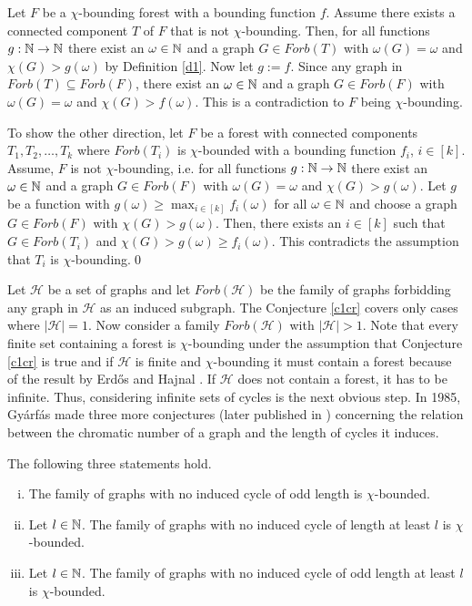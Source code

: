 \begin{prf}
Let $F$ be a $\chi$-bounding forest with a bounding function $f$. Assume there exists a connected component $T$ of $F$ that is not $\chi$-bounding. Then, for all functions $g:\mathbb{N}\to\mathbb{N}$ there exist an $\omega\in\mathbb{N}$ and a graph $G\in \textit{Forb}(T)$ with $\omega (G)=\omega$ and $\chi (G)>g(\omega)$ by Definition \ref{d1}. Now let $g:=f$. Since any graph in $\textit{Forb}(T)\subseteq\textit{Forb}(F)$, there exist an $\omega\in\mathbb{N}$ and a graph $G\in\textit{Forb}(F)$ with $\omega (G) =\omega $ and $\chi (G)>f(\omega )$. This is a contradiction to $F$ being $\chi$-bounding.

To show the other direction, let $F$ be a forest with connected components $T_1, T_2,\dots ,T_k$ where $\textit{Forb}	(T_i)$ is $\chi$-bounded with a bounding function $f_i$, $i\in [k]$. Assume, $F$ is not $\chi$-bounding, i.e. for all functions $g:\mathbb{N}\to\mathbb{N}$ there exist an $\omega\in\mathbb{N}$ and a graph $G\in \textit{Forb}(F)$ with $\omega (G)=\omega$ and $\chi (G)>g(\omega)$. Let $g$ be a function with $g(\omega )\geq\max_{i\in [k]}f_i(\omega )$ for all $\omega\in\mathbb{N}$ and choose a graph $G\in\textit{Forb}(F)$ with $\chi (G)>g(\omega)$. Then, there exists an $i\in [k]$ such that $G\in\textit{Forb}(T_i)$ and $\chi (G)>g(\omega )\geq f_i(\omega )$. This contradicts the assumption that $T_i$ is $\chi$-bounding.\qed
\end{prf}

Let $\mathcal{H}$ be a set of graphs and let $\textit{Forb}(\mathcal{H})$ be the family of graphs forbidding any graph in $\mathcal{H}$ as an induced subgraph. The Conjecture \ref{c1cr} covers only cases where $\vert\mathcal{H}\vert =1$.
Now consider a family $\textit{Forb}(\mathcal{H})$ with $\vert\mathcal{H}\vert >1$. Note that every finite set containing a forest is $\chi$-bounding under the assumption that Conjecture \ref{c1cr} is true and if $\mathcal{H}$ is finite and $\chi$-bounding it must contain a forest because of the result by Erd\H{o}s and Hajnal \cite{EH66}. If $\mathcal{H}$ does not contain a forest, it has to be infinite. Thus, considering infinite sets of cycles is the next obvious step. In 1985, Gyárfás made three more conjectures (later published in \cite{Gy87}) concerning the relation between the chromatic number of a graph and the length of cycles it induces.
\begin{con}
The following three statements hold.
\begin{enumerate}[(i)]
\item The family of graphs with no induced cycle of odd length is $\chi$-bounded.
\item Let $l\in\mathbb{N}$. The family of graphs with no induced cycle of length at least $l$ is $\chi$-bounded.
\item Let $l\in\mathbb{N}$. The family of graphs with no induced cycle of odd length at least $l$ is $\chi$-bounded.
\end{enumerate}
\end{con}

